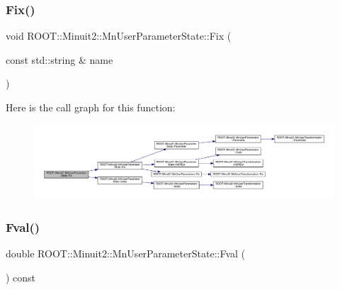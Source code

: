 \subsubsection{\texorpdfstring{Fix()}{Fix()}\hspace{0.1cm}{\footnotesize\ttfamily [4/4]}}
{\footnotesize\ttfamily void R\+O\+O\+T\+::\+Minuit2\+::\+Mn\+User\+Parameter\+State\+::\+Fix (\begin{DoxyParamCaption}\item[{const std\+::string \&}]{name }\end{DoxyParamCaption})}

Here is the call graph for this function\+:\nopagebreak
\begin{figure}[H]
\begin{center}
\leavevmode
\includegraphics[width=350pt]{d3/de0/classROOT_1_1Minuit2_1_1MnUserParameterState_a9d24e3eed7080907f4368e87e8770dcd_cgraph}
\end{center}
\end{figure}
\mbox{\label{classROOT_1_1Minuit2_1_1MnUserParameterState_ab231f5e0a1fa3314210f7849ab382b86}} 
\subsubsection{\texorpdfstring{Fval()}{Fval()}\hspace{0.1cm}{\footnotesize\ttfamily [1/2]}}
{\footnotesize\ttfamily double R\+O\+O\+T\+::\+Minuit2\+::\+Mn\+User\+Parameter\+State\+::\+Fval (\begin{DoxyParamCaption}{ }\end{DoxyParamCaption}) const\hspace{0.3cm}{\ttfamily [inline]}}

